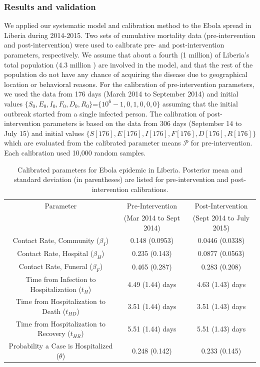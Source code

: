 \subsubsection{Results and validation}
We applied our systematic model and calibration method to the Ebola spread in Liberia during 2014-2015. Two sets of cumulative mortality data (pre-intervention and post-intervention) were used to calibrate pre- and post-intervention parameters, respectively. We assume that about a fourth (1 million) of Liberia's total population (4.3 million \cite{LiberiaPop}) are involved in the model, and that the rest of the population do not have any chance of acquiring the disease due to geographical location or behavioral reasons. For the calibration of pre-intervention parameters, we used the data from 176 days (March 2014 to September 2014) and initial values $\{S_0,E_0,I_0,F_0,D_0,R_0\}$=$\{10^6-1,0,1,0,0,0\}$ assuming that the initial outbreak started from a single infected person. The calibration of post-intervention parameters is based on the data from 306 days (September 14 to July 15) and initial values $\{S[176],E[176],I[176],F[176],D[176],R[176]\}$ which are evaluated from the calibrated parameter means $\mathcal{P}$ for pre-intervention. Each calibration used 10,000 random samples.

\begin{table}[ht]
\centering %
\begin{tabular}{c  c c}
\hline\hline %
Parameter &  Pre-Intervention  & Post-Intervention \\ [0.5ex]
 & (Mar 2014 to Sept 2014) &  (Sept 2014 to July 2015)\\ [0.5ex] %
\hline %
{Contact Rate, Community  (${\beta_{I}}$) }& {0.148 (0.0953)} & {0.0446 (0.0338)}  \\
Contact Rate, Hospital  ($\beta_{H}$) & 0.235 (0.143) & 0.0877 (0.0563) \\
Contact Rate, Funeral  ($\beta_{F}$) & 0.465 (0.287)& 0.283 (0.208) \\
Time from Infection to Hospitalization (${t_{H}}$) & 4.49 (1.44) days & 4.63 (1.43) days  \\
Time from Hospitalization to Death (${t_{HD}}$) & 3.51 (1.44) days & 3.51 (1.43) days  \\
Time from Hospitalization to Recovery (${t_{HR}}$) & 5.51 (1.44) days & 5.51 (1.43) days \\
Probability a Case is Hospitalized ($\theta$) & 0.248 (0.142) & 0.233 (0.145) \\
[1ex]
\hline
\end{tabular}
\caption{Calibrated parameters for Ebola epidemic in Liberia. Posterior mean and standard deviation (in parentheses) are listed for pre-intervention and post-intervention calibrations.}%
\label{tab:calibratedParameters}
\end{table}

